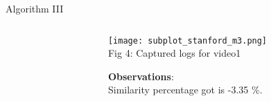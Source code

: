 \documentclass{beamer}
\begin{document}
\begin{frame}{Algorithm III}
\begin{columns}
\begin{column}{0.5\textwidth}
\begin{algorithm}
\begin{algorithmic}
                \end{algorithmic}
            \end{algorithm}
            \hline
        \end{column}
        \begin{column}{0.5\textwidth}
            \begin{center}
                \texttt{[image: subplot\_stanford\_m3.png]} \\
                \footnotesize Fig 4: Captured logs for video1
            \end{center}
            \vspace{0.3em}
            \textbf{Observations}: \\
            Similarity percentage got is -3.35 \%.
        \end{column}
    \end{columns}
\end{frame}
\end{document}
